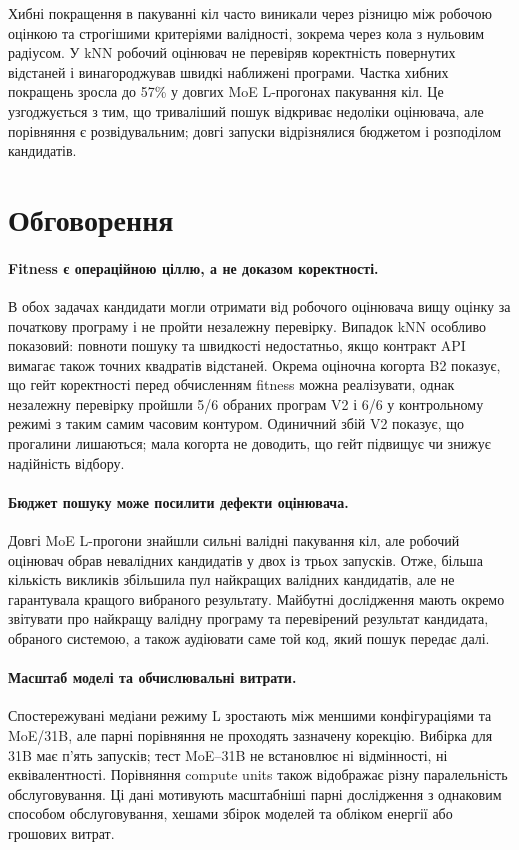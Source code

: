 \documentclass[11pt]{article}
\begin{document}
Хибні покращення в пакуванні кіл часто виникали через різницю між робочою оцінкою та строгішими критеріями валідності, зокрема через кола з нульовим радіусом. У kNN робочий оцінювач не перевіряв коректність повернутих відстаней і винагороджував швидкі наближені програми. Частка хибних покращень зросла до 57\% у довгих MoE L-прогонах пакування кіл. Це узгоджується з тим, що триваліший пошук відкриває недоліки оцінювача, але порівняння є розвідувальним; довгі запуски відрізнялися бюджетом і розподілом кандидатів.

\section{Обговорення}\label{sec:discussion}

\paragraph{Fitness є операційною ціллю, а не доказом коректності.} В обох задачах кандидати могли отримати від робочого оцінювача вищу оцінку за початкову програму і не пройти незалежну перевірку. Випадок kNN особливо показовий: повноти пошуку та швидкості недостатньо, якщо контракт API вимагає також точних квадратів відстаней. Окрема оціночна когорта B2 показує, що гейт коректності перед обчисленням fitness можна реалізувати, однак незалежну перевірку пройшли 5/6 обраних програм V2 і 6/6 у контрольному режимі з таким самим часовим контуром. Одиничний збій V2 показує, що прогалини лишаються; мала когорта не доводить, що гейт підвищує чи знижує надійність відбору.

\paragraph{Бюджет пошуку може посилити дефекти оцінювача.} Довгі MoE L-прогони знайшли сильні валідні пакування кіл, але робочий оцінювач обрав невалідних кандидатів у двох із трьох запусків. Отже, більша кількість викликів збільшила пул найкращих валідних кандидатів, але не гарантувала кращого вибраного результату. Майбутні дослідження мають окремо звітувати про найкращу валідну програму та перевірений результат кандидата, обраного системою, а також аудіювати саме той код, який пошук передає далі.

\paragraph{Масштаб моделі та обчислювальні витрати.} Спостережувані медіани режиму L зростають між меншими конфігураціями та MoE/31B, але парні порівняння не проходять зазначену корекцію. Вибірка для 31B має п'ять запусків; тест MoE--31B не встановлює ні відмінності, ні еквівалентності. Порівняння compute units також відображає різну паралельність обслуговування. Ці дані мотивують масштабніші парні дослідження з однаковим способом обслуговування, хешами збірок моделей та обліком енергії або грошових витрат.
\end{document}
